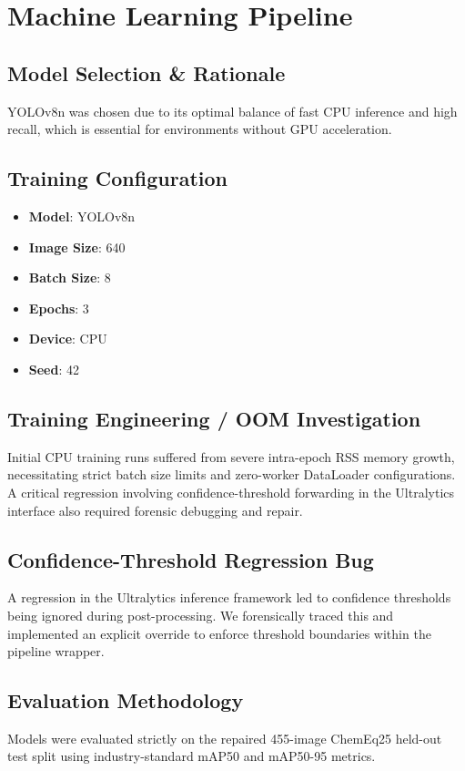 \documentclass[12pt,a4paper]{report}
\begin{document}
\chapter{Machine Learning Pipeline}
\section{Model Selection \& Rationale}
YOLOv8n was chosen due to its optimal balance of fast CPU inference and high recall, which is essential for environments without GPU acceleration.

\section{Training Configuration}
\begin{itemize}
    \item \textbf{Model}: YOLOv8n
    \item \textbf{Image Size}: 640
    \item \textbf{Batch Size}: 8
    \item \textbf{Epochs}: 3
    \item \textbf{Device}: CPU
    \item \textbf{Seed}: 42
\end{itemize}

\section{Training Engineering / OOM Investigation}
Initial CPU training runs suffered from severe intra-epoch RSS memory growth, necessitating strict batch size limits and zero-worker DataLoader configurations. A critical regression involving confidence-threshold forwarding in the Ultralytics interface also required forensic debugging and repair.

\section{Confidence-Threshold Regression Bug}
A regression in the Ultralytics inference framework led to confidence thresholds being ignored during post-processing. We forensically traced this and implemented an explicit override to enforce threshold boundaries within the pipeline wrapper.

\section{Evaluation Methodology}
Models were evaluated strictly on the repaired 455-image ChemEq25 held-out test split using industry-standard mAP50 and mAP50-95 metrics.
\end{document}
